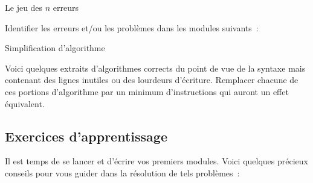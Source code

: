 \begin{Exercice}{Le jeu des $n$ erreurs}

	Identifier les erreurs et/ou les
	problèmes dans les modules suivants~:



\end{Exercice}

\begin{Exercice}{Simplification d’algorithme}

	Voici quelques extraits d’algorithmes corrects du point de vue de la
	syntaxe mais contenant des lignes inutiles ou des lourdeurs d’écriture.
	Remplacer chacune de ces portions d’algorithme par un minimum
	d’instructions qui auront un effet équivalent.





\end{Exercice}

\subsection{Exercices d’apprentissage}

	Il est temps de se lancer et d’écrire vos premiers
	modules. Voici quelques précieux conseils pour vous 
	guider dans la résolution de tels problèmes~:

